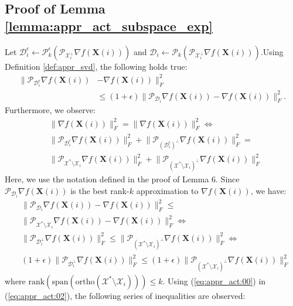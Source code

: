 \documentclass[twocolumn]{svjour3}
\newcommand{\vectornormbig}[1]{\big\|#1\big\|}
\newcommand{\signal}{\boldsymbol{X}}
\newcommand{\rank}{k}
\begin{document}
\subsection{Proof of Lemma \ref{lemma:appr_act_subspace_exp}}

Let 
$\mathcal{D}_i^{\epsilon} \leftarrow \mathcal{P}_{\rank}^{\epsilon}(\mathcal{P}_{\mathcal{X}_i^{\bot}} \nabla f(\signal(i))) $ and 
$\mathcal{D}_i \leftarrow \mathcal{P}_{\rank}(\mathcal{P}_{\mathcal{X}_i^{\bot}} \nabla f(\signal(i))).$Using Definition \ref{def:appr_svd}, the following holds true:
\begin{align}
\vectornormbig{\mathcal{P}_{\mathcal{D}_i^\epsilon} \nabla f(\signal(i))& - \nabla f(\signal(i))}_F^2 \nonumber \\ &\leq (1 + \epsilon) \vectornormbig{\mathcal{P}_{\mathcal{D}_i} \nabla f(\signal(i)) - \nabla f(\signal(i))}_F^2. \label{eq:appr_act:00}
\end{align}
Furthermore, we observe:
\begin{align}
&\vectornormbig{\nabla f(\signal(i))}_F^2 = \vectornormbig{\nabla f(\signal(i))}_F^2 \Leftrightarrow \nonumber \\ 
&\vectornormbig{\mathcal{P}_{\mathcal{D}_i^\epsilon} \nabla f(\signal(i))}_F^2 + \vectornormbig{\mathcal{P}_{(\mathcal{D}_i^\epsilon)^{\bot}} \nabla f(\signal(i))}_F^2 = \nonumber \\  &\vectornormbig{\mathcal{P}_{\mathcal{X}^\ast\setminus \mathcal{X}_i} \nabla f(\signal(i))}_F^2 + \vectornormbig{\mathcal{P}_{(\mathcal{X}^\ast\setminus \mathcal{X}_i)^{\bot}} \nabla f(\signal(i))}_F^2 \label{eq:appr_act:01}
\end{align} Here, we use the notation defined in the proof of Lemma 6. Since $ \mathcal{P}_{\mathcal{D}_i} \nabla f(\signal(i)) $ is the best rank-$ \rank $ approximation to $ \nabla f(\signal(i)) $, we have:
\begin{align}
&\vectornormbig{\mathcal{P}_{\mathcal{D}_i} \nabla f(\signal(i)) - \nabla f(\signal(i))}_F^2 \leq \nonumber \\ &\vectornormbig{\mathcal{P}_{\mathcal{X}^\ast\setminus \mathcal{X}_i} \nabla f(\signal(i)) - \nabla f(\signal(i))}_F^2 \Leftrightarrow \nonumber \\
&\vectornormbig{\mathcal{P}_{\mathcal{D}_i^\bot} \nabla f(\signal(i))}_F^2 \leq \vectornormbig{\mathcal{P}_{(\mathcal{X}^\ast\setminus \mathcal{X}_i)^\bot} \nabla f(\signal(i))}_F^2 \Leftrightarrow \nonumber \\
&(1+\epsilon)\vectornormbig{\mathcal{P}_{\mathcal{D}_i^\bot} \nabla f(\signal(i))}_F^2 \leq (1+\epsilon)\vectornormbig{\mathcal{P}_{(\mathcal{X}^\ast\setminus \mathcal{X}_i)^\bot} \nabla f(\signal(i))}_F^2 \label{eq:appr_act:02}
\end{align} where $ \text{rank}(\text{span}(\text{ortho}(\mathcal{X}^\ast \setminus \mathcal{X}_i))) \leq \rank $. Using (\ref{eq:appr_act:00}) in (\ref{eq:appr_act:02}), the following series of inequalities are observed:
\end{document}
